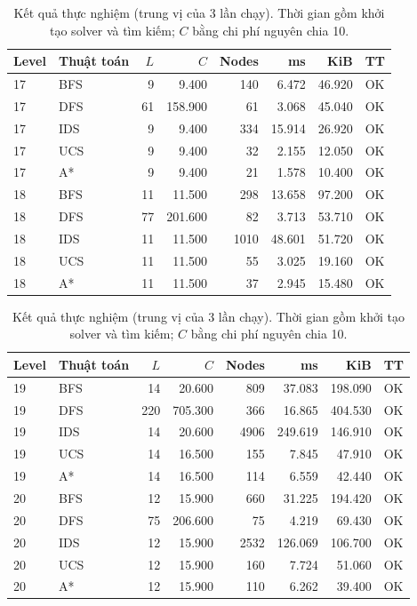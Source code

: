 \begin{table}[htbp]
\centering
\small
\begin{tabular}{llrrrrrl}
\hline
Level & Thuật toán & $L$ & $C$ & Nodes & ms & KiB & TT \\
\hline
17 & BFS & 9 & 9.400 & 140 & 6.472 & 46.920 & OK \\
17 & DFS & 61 & 158.900 & 61 & 3.068 & 45.040 & OK \\
17 & IDS & 9 & 9.400 & 334 & 15.914 & 26.920 & OK \\
17 & UCS & 9 & 9.400 & 32 & 2.155 & 12.050 & OK \\
17 & A* & 9 & 9.400 & 21 & 1.578 & 10.400 & OK \\
18 & BFS & 11 & 11.500 & 298 & 13.658 & 97.200 & OK \\
18 & DFS & 77 & 201.600 & 82 & 3.713 & 53.710 & OK \\
18 & IDS & 11 & 11.500 & 1010 & 48.601 & 51.720 & OK \\
18 & UCS & 11 & 11.500 & 55 & 3.025 & 19.160 & OK \\
18 & A* & 11 & 11.500 & 37 & 2.945 & 15.480 & OK \\
\hline
\end{tabular}
\caption{Kết quả thực nghiệm (trung vị của 3 lần chạy). Thời gian gồm khởi tạo solver và tìm kiếm; $C$ bằng chi phí nguyên chia 10.}
\end{table}

\begin{table}[htbp]
\centering
\small
\begin{tabular}{llrrrrrl}
\hline
Level & Thuật toán & $L$ & $C$ & Nodes & ms & KiB & TT \\
\hline
19 & BFS & 14 & 20.600 & 809 & 37.083 & 198.090 & OK \\
19 & DFS & 220 & 705.300 & 366 & 16.865 & 404.530 & OK \\
19 & IDS & 14 & 20.600 & 4906 & 249.619 & 146.910 & OK \\
19 & UCS & 14 & 16.500 & 155 & 7.845 & 47.910 & OK \\
19 & A* & 14 & 16.500 & 114 & 6.559 & 42.440 & OK \\
20 & BFS & 12 & 15.900 & 660 & 31.225 & 194.420 & OK \\
20 & DFS & 75 & 206.600 & 75 & 4.219 & 69.430 & OK \\
20 & IDS & 12 & 15.900 & 2532 & 126.069 & 106.700 & OK \\
20 & UCS & 12 & 15.900 & 160 & 7.724 & 51.060 & OK \\
20 & A* & 12 & 15.900 & 110 & 6.262 & 39.400 & OK \\
\hline
\end{tabular}
\caption{Kết quả thực nghiệm (trung vị của 3 lần chạy). Thời gian gồm khởi tạo solver và tìm kiếm; $C$ bằng chi phí nguyên chia 10.}
\end{table}
